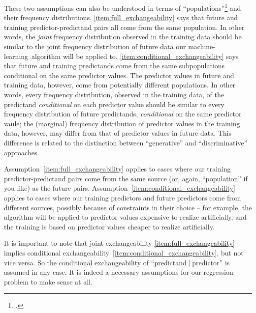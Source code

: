 \documentclass[\ifafour a4paper,12pt,\else a5paper,10pt,\fi%
onecolumn,oneside,article,%
british%
]{memoir}
\theoremstyle{remark}
\theoremstyle{innote}
\newcommand*{\citep}{\footcites}
\renewcommand*{\|}[1][]{\nonscript\:#1\vert\nonscript\:\mathopen{}}
\renewcommand*{\=}{\TextOrMath\texteq\eq}
\newcommand*{\ml}{machine-learning}
\begin{document}
These two assumptions can also be understood in terms of
\enquote{populations}\citep[see the extremely insightful discussion
in][]{lindleyetal1981} and their frequency distributions.
\ref{item:full_exchangeability} says that future and training
predictor-predictand pairs all come from the same population. In other
words, the \emph{joint} frequency distribution observed in the training
data should be similar to the joint frequency distribution of future data
our \ml\ algorithm will be applied to.
\ref{item:conditional_exchangeability} says that future and training
predictands come from the same subpopulations conditional on the same
predictor values. The predictor values in future and training data,
however, come from potentially different populations. In other words, every
frequency distribution, observed in the training data, of the predictand
\emph{conditional} on each predictor value should be similar to every
frequency distribution of future predictands, \emph{conditional} on the
same predictor vaule; the (marginal) frequency distribution of predictor
values in the training data, however, may differ from that of predictor
values in future data. This difference is related to the distinction
between \enquote{generative} and \enquote{discriminative} approaches.

Assumption~\ref{item:full_exchangeability} applies to cases where our
training predictor-predictand pairs come from the same source (or, again,
\enquote{population} if you like) as the future pairs.
Assumption~\ref{item:conditional_exchangeability} applies to cases where
our training predictors and future predictors come from different sources,
possibly because of constraints in their choice -- for example, the
algorithm will be applied to predictor values expensive to realize
artificially, and the training is based on predictor values cheaper to
realize artificially.

It is important to note that joint exchangeability
\ref{item:full_exchangeability} implies conditional
exchangeability~\ref{item:conditional_exchangeability}, but not vice versa.
So the conditional exchangeability of \enquote{predictand${}\|{}$predictor}
is assumed in any case. It is indeed a necessary assumptions for our
regression problem to make sense at all.
\end{document}
